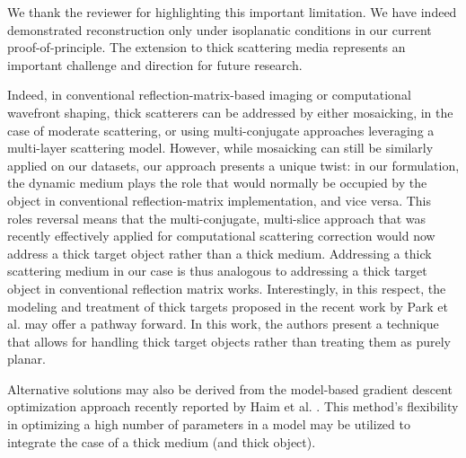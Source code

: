 \documentclass[12pt]{article}
\newenvironment{ourresponse}
    {\begin{tcolorbox}[width=\linewidth,breakable,enhanced,colback=gray!5,colframe=responsecolor!50,title=Response,left=5pt,right=5pt]}
    {\end{tcolorbox}}
\begin{document}
\begin{ourresponse}
    We thank the reviewer for highlighting this important limitation. We have indeed demonstrated reconstruction only under isoplanatic conditions in our current proof-of-principle. The extension to thick scattering media represents an important challenge and direction for future research.

    Indeed, in conventional reflection-matrix-based imaging or computational wavefront shaping, thick scatterers can be addressed by either mosaicking, in the case of moderate scattering, or using multi-conjugate approaches leveraging a multi-layer scattering model. However, while mosaicking can still be similarly applied on our datasets, our approach presents a unique twist: in our formulation, the dynamic medium plays the role that would normally be occupied by the object in conventional reflection-matrix implementation, and vice versa. This roles reversal means that the multi-conjugate, multi-slice approach that was recently effectively applied for computational scattering correction would now address a thick target object rather than a thick medium. Addressing a thick scattering medium in our case is thus analogous to addressing a thick target object in conventional reflection matrix works. Interestingly, in this respect, the modeling and treatment of thick targets proposed in the recent work by Park et al. \cite{oh2025digital} may offer a pathway forward. In this work, the authors present a technique that allows for handling thick target objects rather than treating them as purely planar. 

    Alternative solutions may also be derived from the model-based gradient descent optimization approach recently reported by Haim et al. \cite{haim2025image}. This method's flexibility in optimizing a high number of parameters in a model may be utilized to integrate the case of a thick medium (and thick object).
    

\end{ourresponse}
\end{document}
